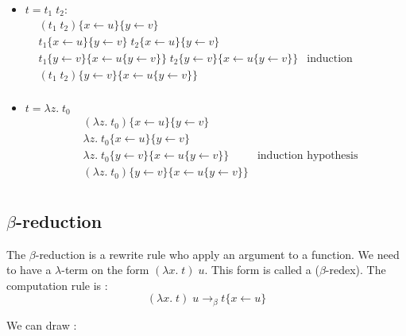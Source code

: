\begin{itemize}
    \item $t = t_1\; t_2$:
      \begin{align*}
        &(t_1\;t_2)\{x\leftarrow u\}\{y\leftarrow v\} \\
        &t_1\{x\leftarrow u\}\{y\leftarrow v\}\;t_2\{x\leftarrow u\}\{y\leftarrow v\} \\
        &t_1\{y\leftarrow v\}\{x\leftarrow u\{y\leftarrow v\}\}\;
         t_2\{y\leftarrow v\}\{x\leftarrow u\{y\leftarrow v\}\} &
         \text{induction hypothesis} \\
        &(t_1\;t_2)\{y\leftarrow v\}\{x\leftarrow u\{y\leftarrow v\}\}\\
      \end{align*}

    \item $t = \lambda z.\;t_0$
      \begin{align*}
        &(\lambda z.\;t_0)\{x\leftarrow u\}\{y\leftarrow v\} \\
        &\lambda z.\;t_0\{x\leftarrow u\}\{y\leftarrow v\} \\
        &\lambda z.\;t_0\{y\leftarrow v\}\{x\leftarrow u\{y\leftarrow v\}\} &
        \text{induction hypothesis}\\
        &(\lambda z.\;t_0)\{y\leftarrow v\}\{x\leftarrow u\{y\leftarrow v\}\} \\
      \end{align*}

  \end{itemize}
  \qedsymbol

  \subsection{$\beta$-reduction}

    The $\beta$-reduction is a rewrite rule who apply an argument to a function.
    We need to have a $\lambda$-term on the form $(\lambda x.\;t)\; u$. This
    form is called a ($\beta$-redex). The computation rule is :
    \[(\lambda x.\;t)\; u \to_\beta t\{x \leftarrow u\}\]

    We can draw :


